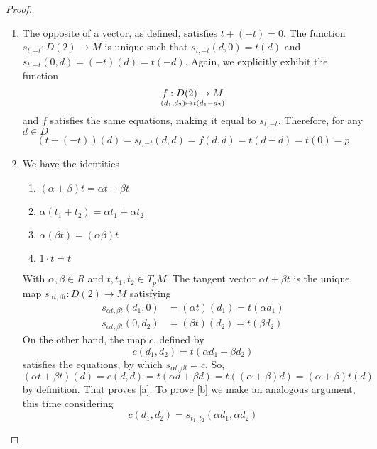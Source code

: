 \begin{proof}
\begin{enumerate}
    \item The opposite of a vector, as defined, satisfies \( t + (-t) = 0 \). The function \( s_{t,-t}:D(2)\to M \) is unique such that \( s_{t,-t}(d,0) = t(d) \) and \( s_{t,-t}(0,d) = (-t)(d) = t(-d) \). Again, we explicitly exhibit the function
      \begin{equation*}
	f:D(2)\to M \atop (d_1,d_2)\mapsto t(d_1-d_2)
      \end{equation*}
      and \( f \) satisfies the same equations, making it equal to \( s_{t,-t} \). Therefore, for any \( d\in D \)
      \begin{equation*}
	(t+(-t))(d) = s_{t,-t}(d,d) = f(d,d) = t(d-d) = t(0) = p
      \end{equation*}

    \item We have the identities
      \begin{enumerate}
	\item\label{a} \( (\alpha + \beta)t = \alpha t + \beta t \)
	\item\label{b} \( \alpha(t_1+t_2) = \alpha t_1 + \alpha t_2\)
	\item\label{c} \( \alpha (\beta t) = (\alpha \beta) t\)
	\item\label{d} \( 1\cdot t = t \)
      \end{enumerate}
      With \( \alpha,\beta\in R \) and \( t,t_1,t_2\in T_pM \). The tangent vector \( \alpha t + \beta t \) is the unique map \( s_{\alpha t, \beta t}:D(2)\to M \) satisfying
      \begin{align*}
	s_{\alpha t, \beta t}(d_1,0) &= (\alpha t)(d_1)= t(\alpha d_1) \\
	s_{\alpha t, \beta t}(0,d_2) &= (\beta t)(d_2)= t(\beta d_2)
      \end{align*}
      On the other hand, the map \( c \), defined by
      \begin{equation*}
       c(d_1,d_2) = t(\alpha d_1 + \beta d_2)
      \end{equation*}
      satisfies the equations, by which \( s_{\alpha t, \beta t} = c\). So,
      \begin{equation*}
	(\alpha t + \beta t)(d) = c(d,d) = t(\alpha d + \beta d) = t((\alpha + \beta)d) = (\alpha + \beta)t(d)
      \end{equation*}
      by definition. That proves \ref{a}. To prove \ref{b} we make an analogous argument, this time considering
      \begin{equation*}
	c(d_1,d_2) = s_{t_1,t_2}(\alpha d_1, \alpha d_2)
      \end{equation*}

\end{enumerate}
\end{proof}
